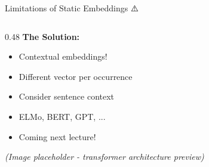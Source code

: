 \documentclass[aspectratio=169]{beamer}
\begin{document}
\begin{frame}[shrink=10]{Limitations of Static Embeddings ⚠️}
\begin{columns}[T]
\begin{column}{0.48\textwidth}
\textbf{The Solution:}
\begin{itemize}\setlength{\itemsep}{0pt}
    \item \alert{Contextual embeddings!}
    \item Different vector per occurrence
    \item Consider sentence context
    \item ELMo, BERT, GPT, ...
    \item Coming next lecture!
\end{itemize}

\vspace{0.5em}
\begin{center}
\textit{(Image placeholder - transformer architecture preview)}
\end{center}
\end{column}
\end{columns}
\end{frame}
\end{document}

